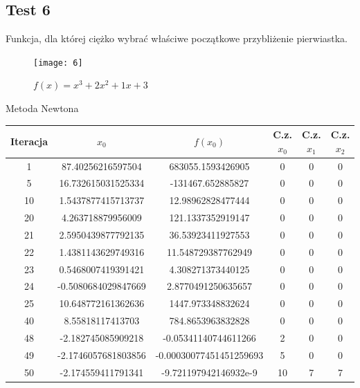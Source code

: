 \documentclass[a4paper]{article}
\begin{document}
\newpage
\subsection{Test 6}
Funkcja, dla której ciężko wybrać właściwe początkowe przybliżenie pierwiastka.
    \begin{figure}[h]
        \centering
        \texttt{[image: 6]}
        \caption{$f(x) = x^3 + 2x^2 + 1x + 3$}
    \end{figure}

    \begin{center}
        Metoda Newtona
    \end{center}
    \begin{center}
        \begin{tabular}{|c|c|c|c|c|c|} 
            \hline
            Iteracja & $x_0$ & $f(x_0)$ & C.z. $x_0$ & C.z. $x_1$ & C.z. $x_2$ \\
            \hline
            1 & 87.40256216597504 & 683055.1593426905 & 0 & 0 & 0 \\
            \hline
            5 & 16.732615031525334 & -131467.652885827 & 0 & 0 & 0 \\
            \hline
            10 & 1.5437877415713737 & 12.98962828477444 & 0 & 0 & 0 \\
            \hline
            20 & 4.263718879956009 & 121.1337352919147 & 0 & 0 & 0 \\
            \hline
            21 & 2.5950439877792135 & 36.53923411927553 & 0 & 0 & 0 \\
            \hline
            22 & 1.4381143629749316 & 11.548729387762949 & 0 & 0 & 0 \\
            \hline
            23 & 0.5468007419391421 & 4.308271373440125 & 0 & 0 & 0 \\
            \hline
            24 & -0.5080684029847669 & 2.8770491250635657 & 0 & 0 & 0 \\
            \hline
            25 & 10.648772161362636 & 1447.973348832624 & 0 & 0 & 0 \\
            \hline
            40 & 8.55818117413703 & 784.8653963832828 & 0 & 0 & 0 \\
            \hline
            48 & -2.182745085909218 & -0.05341140744611266 & 2 & 0 & 0 \\
            \hline
            49 & -2.1746057681803856 & -0.00030077451451259693 & 5 & 0 & 0 \\
            \hline
            50 & -2.174559411791341 & -9.721197942146932e-9 & 10 & 7 & 7 \\
            \hline

        \end{tabular}
    \end{center}
        
\end{document}
